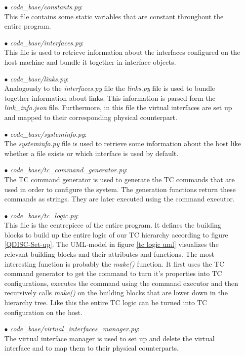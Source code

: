\begin{enumerate}
\item[$\bullet$]\textit{code\_base/constants.py}:
\\
This file contains some static variables that are constant throughout the entire program. 

\item[$\bullet$]\textit{code\_base/interfaces.py}:
\\
This file is used to retrieve information about the interfaces configured on the host machine and bundle it together in interface objects.

\item[$\bullet$]\textit{code\_base/links.py}:
\\
Analogously to the \textit{interfaces.py} file the \textit{links.py} file is used to bundle together information about links. This information is parsed form the \textit{link\_info.json} file. Furthermore, in this file the virtual interfaces are set up and mapped to their corresponding physical counterpart.

\item[$\bullet$]\textit{code\_base/systeminfo.py}:
\\
The \textit{systeminfo.py} file is used to retrieve some information about the host like whether a file exists or which interface is used by default.

\item[$\bullet$]\textit{code\_base/tc\_command\_generator.py}:
\\
The \acs{TC} command generator is used to generate the \acs{TC} commands that are used in order to configure the system. The generation functions return these commands as strings. They are later executed using the command executor.

\item[$\bullet$]\textit{code\_base/tc\_logic.py}:
\\
This file is the centrepiece of the entire program. It defines the building blocks to build up the entire logic of our \acs{TC} hierarchy according to figure \ref{QDISC-Set-up}. The \ac{UML}-model in figure \ref{tc logic uml} visualizes the relevant building blocks and their attributes and functions. The most interesting function is probably the \textit{make()} function. It first uses the \acs{TC} command generator to get the command to turn it's properties into \acs{TC} configurations, executes the command using the command executor and then recursively calls \textit{make()} on the building blocks that are lower down in the hierarchy tree. Like this the entire \acs{TC} logic can be turned into \acs{TC} configuration on the host. 

\item[$\bullet$]\textit{code\_base/virtual\_interfaces\_manager.py}:
\\
The virtual interface manager is used to set up and delete the virtual interface and to map them to their physical counterparts.

\end{enumerate}

